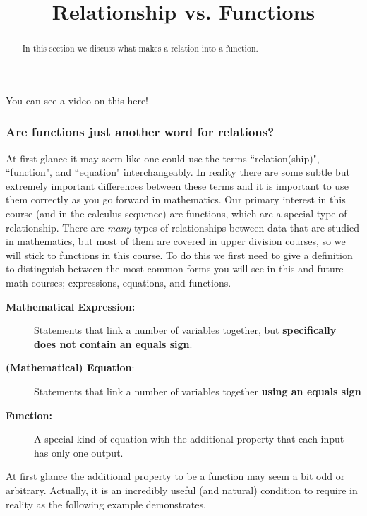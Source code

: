 \documentclass{ximera}
\title{Relationship vs. Functions}
\begin{document}
\begin{abstract}
    In this section we discuss what makes a relation into a function.
\end{abstract}
\maketitle
    
    You can see a video on this here!
    

\subsubsection*{Are functions just another word for relations?}

    At first glance it may seem like one could use the terms ``relation(ship)", ``function", and ``equation" interchangeably. In reality there are some subtle but extremely important differences between these terms and it is important to use them correctly as you go forward in mathematics. Our primary interest in this course (and in the calculus sequence) are functions, which are a special type of relationship. There are \textit{many} types of relationships between data that are studied in mathematics, but most of them are covered in upper division courses, so we will stick to functions in this course. To do this we first need to give a definition to distinguish between the most common forms you will see in this and future math courses; expressions, equations, and functions.
    
    \begin{description}
        \item[\textbf{Mathematical Expression:}] Statements that link a number of variables together, but \textbf{specifically does not contain an equals sign}.
        \item[\textbf{(Mathematical) Equation}:] Statements that link a number of variables together \textbf{using an equals sign}
        \item[\textbf{Function:}] A special kind of equation with the additional property that each input has only one output.
    \end{description}
    
    At first glance the additional property to be a function may seem a bit odd or arbitrary. Actually, it is an incredibly useful (and natural) condition to require in reality as the following example demonstrates.
    
\end{document}
